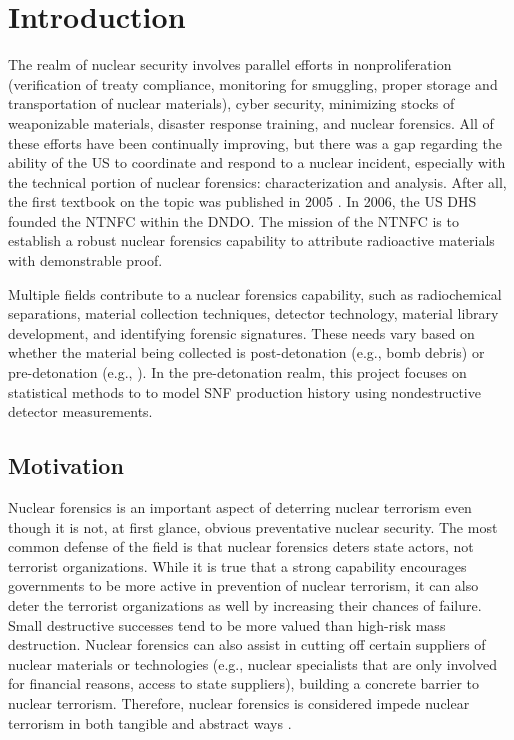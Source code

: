 \chapter{Introduction}
\label{ch:intro}

The realm of nuclear security involves parallel efforts in nonproliferation
(verification of treaty compliance, monitoring for smuggling, proper storage
and transportation of nuclear materials), cyber security, minimizing stocks of
weaponizable materials, disaster response training, and nuclear forensics. All
of these efforts have been continually improving, but there was a gap regarding
the ability of the \gls{US} to coordinate and respond to a nuclear incident,
especially with the technical portion of nuclear forensics: characterization
and analysis. After all, the first textbook on the topic was published in 2005
\cite{nftext_2005}. In 2006, the \gls{US} \gls{DHS} founded the \gls{NTNFC}
within the \gls{DNDO}. The mission of the \gls{NTNFC} is to establish a robust
nuclear forensics capability to attribute radioactive materials with
demonstrable proof.

Multiple fields contribute to a nuclear forensics capability, such as
radiochemical separations, material collection techniques, detector technology,
material library development, and identifying forensic signatures. These needs
vary based on whether the material being collected is post-detonation (e.g.,
bomb debris) or pre-detonation (e.g., ).  In the pre-detonation
realm, this project focuses on statistical methods to to model \gls{SNF}
production history using nondestructive detector measurements. 

\section{Motivation}
\label{sec:motivation}

Nuclear forensics is an important aspect of deterring nuclear terrorism even
though it is not, at first glance, obvious preventative nuclear security.  The
most common defense of the field is that nuclear forensics deters state actors,
not terrorist organizations. While it is true that a strong capability
encourages governments to be more active in prevention of nuclear terrorism, it
can also deter the terrorist organizations as well by increasing their chances
of failure. Small destructive successes tend to be more valued than high-risk
mass destruction. Nuclear forensics can also assist in cutting off certain
suppliers of nuclear materials or technologies (e.g., nuclear specialists that
are only involved for financial reasons, access to state suppliers), building a
concrete barrier to nuclear terrorism.  Therefore, nuclear forensics is
considered impede nuclear terrorism in both tangible and abstract ways
\cite{aps_aaas_forensics}.

